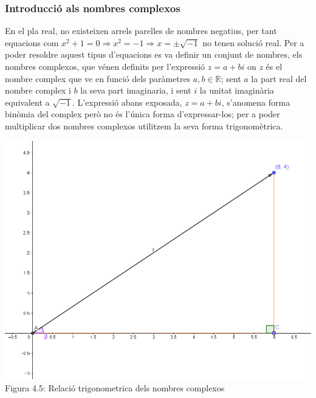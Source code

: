 \documentclass[12pt]{report}
\begin{document}
\subsubsection{Introducció als nombres complexos}
En el pla real, no existeixen arrels parelles de nombres negatius, per tant equacions com $x^2+1=0 \Rightarrow x^2 = -1 \Rightarrow x=\pm\sqrt{-1}$ no tenen solució real.
\newline
Per a poder resoldre aquest tipus d'equacions es va definir un conjunt de nombres, els nombres complexos, que vénen definits per l'expressió $z=a+bi$ on $z$ és el nombre complex que ve en funció dels paràmetres $a,b \in \mathbb{R}$; sent $a$ la part real del nombre complex i $b$ la seva part imaginaria, i sent $i$ la unitat imaginària equivalent a $\sqrt{-1}$.
\newline
L'expressió abans exposada, $z=a+bi$, s'anomena forma binòmia del complex però no és l'única forma d'expressar-los; per a poder multiplicar dos nombres complexos utilitzem la seva forma trigonomètrica.
\begin{center}
    \includegraphics[width=0.7 \textwidth]{Trigonometria.PNG}
    \newline
    Figura 4.5: Relació trigonometrica dels nombres complexos
\end{center}
\end{document}
